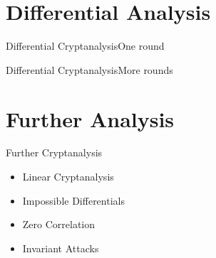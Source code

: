 \section{Differential Analysis}
\begin{frame}{Differential Cryptanalysis}{One round}
\end{frame}

\begin{frame}{Differential Cryptanalysis}{More rounds}
\end{frame}

\section{Further Analysis}
\begin{frame}{Further Cryptanalysis}
    \begin{itemize}
        \item Linear Cryptanalysis
        \item Impossible Differentials
        \item Zero Correlation
        \item Invariant Attacks
    \end{itemize}
\end{frame}

